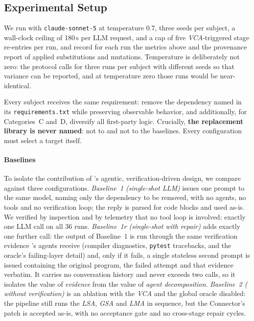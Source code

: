 \subsection{Experimental Setup}

We run \sys with \texttt{claude-sonnet-5} at temperature 0.7, three seeds per subject, a wall-clock ceiling of 180\,s per LLM request, and a cap of five \emph{VCA}-triggered stage re-entries per run, and record for each run the metrics above and the provenance report of applied substitutions and mutations. Temperature is deliberately not zero: the protocol calls for three runs per subject with different seeds so that variance can be reported, and at temperature zero those runs would be near-identical.

Every subject receives the same requirement: remove the dependency named in its \texttt{requirements.txt} while preserving observable behavior, and additionally, for Categories~C and~D, diversify all first-party logic. Crucially, \textbf{the replacement library is never named}: not to \sys and not to the baselines. Every configuration must select a target itself.

\paragraph{Baselines}
To isolate the contribution of \sys's agentic, verification-driven design, we compare against three configurations. \emph{Baseline~1 (single-shot LLM)} issues one prompt to the same model, naming only the dependency to be removed, with no agents, no tools and no verification loop; the reply is parsed for code blocks and used as-is. We verified by inspection and by telemetry that no tool loop is involved: exactly one LLM call on all 36 runs. \emph{Baseline~1r (single-shot with repair)} adds exactly one further call: the output of Baseline~1 is run through the same verification evidence \sys's agents receive (compiler diagnostics, \texttt{pytest} tracebacks, and the oracle's failing-layer detail) and, only if it fails, a single stateless second prompt is issued containing the original program, the failed attempt and that evidence verbatim. It carries no conversation history and never exceeds two calls, so it isolates the value of \emph{evidence} from the value of \emph{agent decomposition}. \emph{Baseline~2 (\textup{\sys} without verification)} is an ablation with the \emph{VCA} and the global oracle disabled: the pipeline still runs the \emph{LSA}, \emph{GSA} and \emph{LMA} in sequence, but the Connector's patch is accepted as-is, with no acceptance gate and no cross-stage repair cycles.

